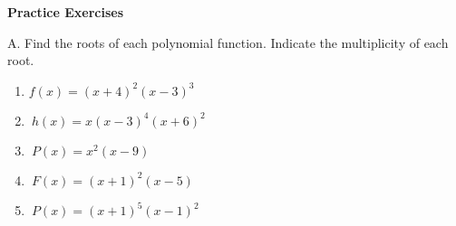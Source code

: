\textbf{Practice Exercises}

\vspce

A. Find the roots of each polynomial function. Indicate the multiplicity of each root.  


\begin{enumerate}[label = \arabic*. ]

\item \hspce ${f(x) = (x+4)^2(x-3)^3 } $
\vspce
\item \hspce $\ {h(x) = x(x-3)^4(x+6)^2}$
\vspce
\item \hspce $\ {P(x) = x^2(x-9)}$
\vspce
\item \hspce $\ {F(x) = (x+1)^2(x-5)}$
\vspce
\item \hspce $\ {P(x) = (x+1)^5(x-1)^2}$


\end{enumerate}



 



